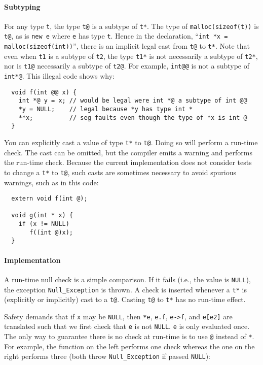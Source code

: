 \paragraph{Subtyping}
For any type \texttt{t}, the type \texttt{t@} is a subtype of \texttt{t*}.
The type of \texttt{malloc(sizeof(t))} is \texttt{t@}, as is \texttt{new e}
where \texttt{e} has type \texttt{t}.  Hence in the declaration,
``\texttt{int *x = malloc(sizeof(int))}'', there is an implicit legal
cast from \texttt{t@} to \texttt{t*}.  Note that even when \texttt{t1} is a
subtype of \texttt{t2}, the type \texttt{t1*} is not necessarily a subtype
of \texttt{t2*}, nor is \texttt{t1@} necessarily a subtype of \texttt{t2@}.
For example, \texttt{int@@} is not a subtype of \texttt{int*@}.  This
illegal code shows why:

\begin{verbatim}
  void f(int @@ x) {
    int *@ y = x; // would be legal were int *@ a subtype of int @@
    *y = NULL;    // legal because *y has type int *
    **x;          // seg faults even though the type of *x is int @
  }
\end{verbatim}

You can explicitly cast a value of type \texttt{t*} to
\texttt{t@}.  Doing so will perform a run-time check.  The
cast can be omitted, but the compiler emits a warning and performs the
run-time check.  Because the current implementation does not
consider tests to change a \texttt{t*} to \texttt{t@}, such casts are
sometimes necessary to avoid spurious warnings, such as in this code:

\begin{verbatim}
  extern void f(int @);

  void g(int * x) {
    if (x != NULL)
       f((int @)x);
  }
\end{verbatim}

\paragraph{Implementation}
A run-time null check is a simple comparison.  If it fails (i.e., the
value is \texttt{NULL}), the exception \texttt{Null_Exception} is thrown.
A check is inserted whenever a \texttt{t*} is (explicitly or implicitly)
cast to a \texttt{t@}.  Casting \texttt{t@} to \texttt{t*} has no run-time
effect.

Safety demands that if \texttt{x} may be \texttt{NULL}, then \texttt{*e},
\texttt{e.f}, \texttt{e->f}, and \texttt{e[e2]} are translated such that we
first check that \texttt{e} is not \texttt{NULL}.  \texttt{e} is only
evaluated once.  The only way to guarantee there is no check at
run-time is to use \texttt{@} instead of \texttt{*}.  For example, the
function on the left performs one check whereas the one on the right
performs three (both throw \texttt{Null_Exception} if passed
\texttt{NULL}):

